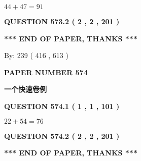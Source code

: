 \documentclass{ctexart}
\begin{document}
  
 
 

$ %
44 +  %
47=   %
91$
 
 
  
\vspace{0.2in}
  
{\textbf{\Large{QUESTION
573.2 
 ( 2 , 2 , 201 )
}}}
  
  
   
   
 \vspace{0.2in}
 
   
   
   
   
\vspace{1.0in} 
{\textbf{\large{ *** END OF PAPER, THANKS *** }}} 
   
   
\hspace{1.0in} By: 
 239 ( 416 ,  613 )
   
   
   
   
\newpage 
\setcounter{page}{ 
   574001 } 
   
   
   
   
 {\textbf{ \Large{ PAPER NUMBER  574  }}}
   
   
\vspace{0.2in}
   
   
   
   
   
   
 \vspace{0.2in}
{\LARGE {\textbf{ 一个快速卷例}}}
   
   
  
\vspace{0.2in}
  
{\textbf{\Large{QUESTION
574.1 
 ( 1 , 1 , 101 )
}}}
  
  
 
 

$ %
22 +  %
54=   %
76$
 
 
  
\vspace{0.2in}
  
{\textbf{\Large{QUESTION
574.2 
 ( 2 , 2 , 201 )
}}}
  
  
   
   
 \vspace{0.2in}
 
   
   
   
   
\vspace{1.0in} 
{\textbf{\large{ *** END OF PAPER, THANKS *** }}} 
   
\end{document}
